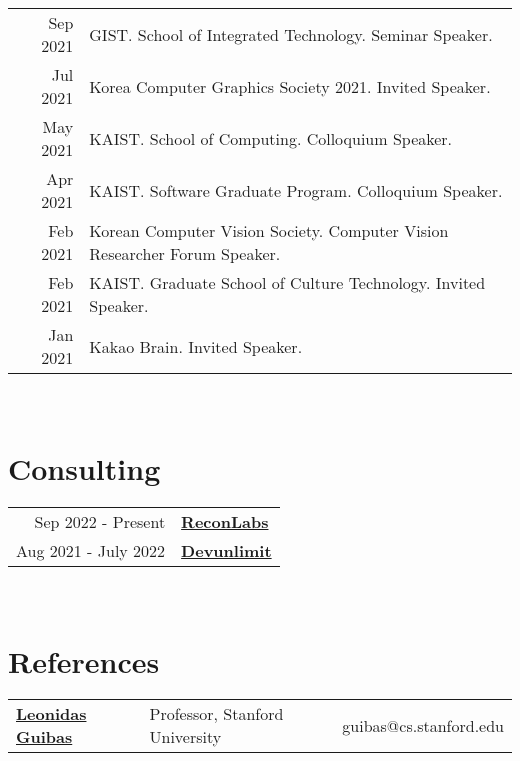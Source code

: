 \documentclass[letterpaper,10pt]{article} %
\newcommand{\blankline}{\quad\pagebreak[2]}
\begin{document}
{\begin{tabular}{r|p{11cm}}
Sep 2021 & GIST. School of Integrated Technology. Seminar Speaker.\\
Jul 2021 & Korea Computer Graphics Society 2021. Invited Speaker.\\
May 2021 & KAIST. School of Computing. Colloquium Speaker.\\
Apr 2021 & KAIST. Software Graduate Program. Colloquium Speaker.\\
Feb 2021 & Korean Computer Vision Society. Computer Vision Researcher Forum Speaker.\\
Feb 2021 & KAIST. Graduate School of Culture Technology. Invited Speaker.\\
Jan 2021 & Kakao Brain. Invited Speaker.\\
\end{tabular}\\

\blankline



\section{Consulting}

\begin{tabular}{r|p{14cm}}
Sep 2022 - Present & \href{https://en.reconlabs.ai/}{\textbf{ReconLabs}}\\
Aug 2021 - July 2022 & \href{https://www.devunlimit.com/}{\textbf{Devunlimit}}\\
\end{tabular}\\



\iffalse

\section{References}

\renewcommand{\arraystretch}{1.5}
\begin{tabular}{lll}

\href{https://geometry.stanford.edu/member/guibas/}{\textbf{Leonidas Guibas}} &
Professor, Stanford University &
guibas@cs.stanford.edu\\


\end{tabular}}
\end{document}
